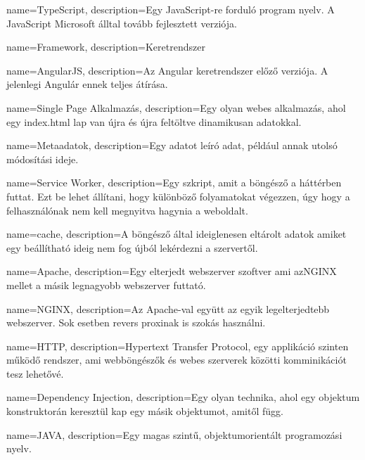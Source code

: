 {
        name=TypeScript,
        description={Egy JavaScript-re forduló program nyelv. A JavaScript Microsoft álltal tovább fejlesztett verziója.}
}

{
        name=Framework,
        description={Keretrendszer}
}

{
        name=AngularJS,
        description={Az Angular keretrendszer előző verziója. A jelenlegi Angulár ennek teljes átírása.}
}

{
        name=Single Page Alkalmazás,
        description={Egy olyan webes alkalmazás, ahol egy index.html lap van újra és újra feltöltve dinamikusan adatokkal.}
}

{
        name=Metaadatok,
        description={Egy adatot leíró adat, például annak utolsó módosítási ideje.}
}

{
        name=Service Worker,
        description={Egy szkript, amit a böngésző a háttérben futtat. 
        Ezt be lehet állítani, hogy különböző folyamatokat végezzen, úgy hogy a felhasználónak nem kell megnyitva hagynia a weboldalt.}
}

{
        name=cache,
        description={A böngésző által ideiglenesen eltárolt adatok amiket egy beállítható ideig nem fog újból lekérdezni a szervertől.}
}

{
        name=Apache,
        description={Egy elterjedt webszerver szoftver ami az\Gls{NGINX} mellet a másik legnagyobb webszerver futtató.}
}

{
        name=NGINX,
        description={Az \Gls{Apache}-val együtt az egyik legelterjedtebb webszerver. Sok esetben revers proxinak is szokás használni.}
}

{
        name=HTTP,
        description={Hypertext Transfer Protocol, egy applikáció szinten működő rendszer, ami webböngészők és webes szerverek közötti komminikációt tesz lehetővé.}
}

{
        name=Dependency Injection,
        description={Egy olyan technika, ahol egy objektum konstruktorán keresztül kap egy másik objektumot, amitől függ.}
}

{
        name=JAVA,
        description={Egy magas szintű, objektumorientált programozási nyelv.}
}

